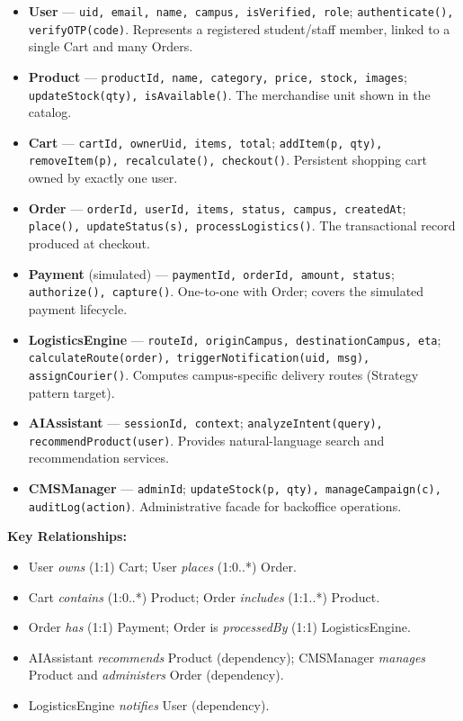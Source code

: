 \documentclass[11pt,a4paper]{article}
\begin{document}
\begin{itemize}
    \item \textbf{User} --- \texttt{uid, email, name, campus, isVerified, role}; \texttt{authenticate(), verifyOTP(code)}. Represents a registered student/staff member, linked to a single Cart and many Orders.
    \item \textbf{Product} --- \texttt{productId, name, category, price, stock, images}; \texttt{updateStock(qty), isAvailable()}. The merchandise unit shown in the catalog.
    \item \textbf{Cart} --- \texttt{cartId, ownerUid, items, total}; \texttt{addItem(p, qty), removeItem(p), recalculate(), checkout()}. Persistent shopping cart owned by exactly one user.
    \item \textbf{Order} --- \texttt{orderId, userId, items, status, campus, createdAt}; \texttt{place(), updateStatus(s), processLogistics()}. The transactional record produced at checkout.
    \item \textbf{Payment} (simulated) --- \texttt{paymentId, orderId, amount, status}; \texttt{authorize(), capture()}. One-to-one with Order; covers the simulated payment lifecycle.
    \item \textbf{LogisticsEngine} --- \texttt{routeId, originCampus, destinationCampus, eta}; \texttt{calculateRoute(order), triggerNotification(uid, msg), assignCourier()}. Computes campus-specific delivery routes (Strategy pattern target).
    \item \textbf{AIAssistant} --- \texttt{sessionId, context}; \texttt{analyzeIntent(query), recommendProduct(user)}. Provides natural-language search and recommendation services.
    \item \textbf{CMSManager} --- \texttt{adminId}; \texttt{updateStock(p, qty), manageCampaign(c), auditLog(action)}. Administrative facade for backoffice operations.
\end{itemize}

\noindent\textbf{Key Relationships:}
\begin{itemize}
    \item User \textit{owns} (1:1) Cart; User \textit{places} (1:0..*) Order.
    \item Cart \textit{contains} (1:0..*) Product; Order \textit{includes} (1:1..*) Product.
    \item Order \textit{has} (1:1) Payment; Order is \textit{processedBy} (1:1) LogisticsEngine.
    \item AIAssistant \textit{recommends} Product (dependency); CMSManager \textit{manages} Product and \textit{administers} Order (dependency).
    \item LogisticsEngine \textit{notifies} User (dependency).
\end{itemize}
\end{document}
